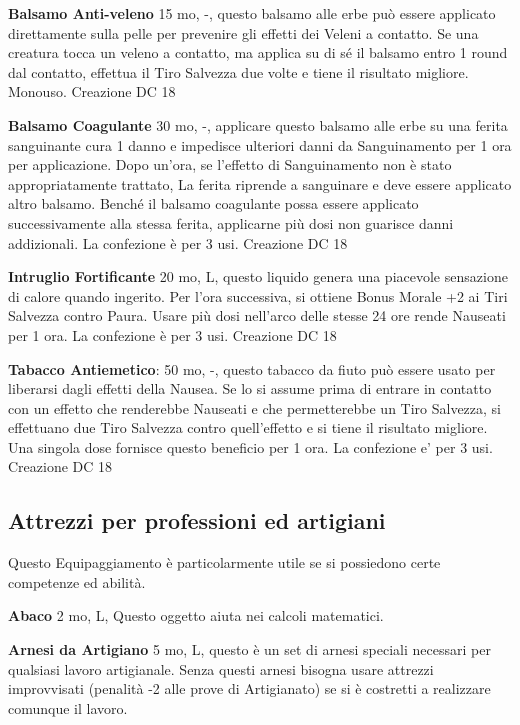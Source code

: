 \documentclass[a4paper,11pt,twoside,openany]{book}
\begin{document}
{\textbf{Balsamo Anti-veleno} 15 mo, -, questo balsamo alle erbe può essere applicato direttamente sulla pelle per prevenire gli effetti dei Veleni a contatto. Se una creatura tocca un veleno a contatto, ma applica su di sé il balsamo entro 1 round dal contatto, effettua il Tiro Salvezza due volte e tiene il risultato migliore. Monouso. Creazione DC 18

\textbf{Balsamo Coagulante} 30 mo, -, applicare questo balsamo alle erbe su una ferita sanguinante cura 1 danno e impedisce ulteriori danni da Sanguinamento per 1 ora per applicazione. Dopo un'ora, se l'effetto di Sanguinamento non è stato appropriatamente trattato, 
La ferita riprende a sanguinare e deve essere applicato altro balsamo. Benché il balsamo coagulante possa essere applicato successivamente alla stessa ferita, applicarne più dosi non guarisce danni addizionali. La confezione è per 3 usi. Creazione DC 18

\textbf{Intruglio Fortificante} 20 mo, L, questo liquido genera una piacevole sensazione di calore quando ingerito. Per l'ora successiva, si ottiene Bonus Morale +2 ai Tiri Salvezza contro Paura. Usare più dosi nell'arco delle stesse 24 ore rende Nauseati per 1 ora. La confezione è per 3 usi. Creazione DC 18

\textbf{Tabacco Antiemetico}: 50 mo, -, questo tabacco da fiuto può essere usato per liberarsi dagli effetti della Nausea. Se lo si assume prima di entrare in contatto con un effetto che renderebbe Nauseati e che permetterebbe un Tiro Salvezza, si effettuano due Tiro Salvezza contro quell'effetto e si tiene il risultato migliore. Una singola dose fornisce questo beneficio per 1 ora. La confezione e’ per 3 usi. Creazione DC 18

\pagebreak

\subsection{Attrezzi per professioni ed artigiani}

\label{attrezzi-per-professioni-ed-artigiani}

Questo Equipaggiamento è particolarmente utile se si possiedono certe competenze ed abilità.

\textbf{Abaco} 2 mo, L, Questo oggetto aiuta nei calcoli matematici.

\textbf{Arnesi da Artigiano} 5 mo, L, questo è un set di arnesi speciali necessari per qualsiasi lavoro artigianale. Senza questi arnesi bisogna usare attrezzi improvvisati (penalità -2 alle prove di Artigianato) se si è costretti a realizzare comunque il lavoro.

}
\end{document}
